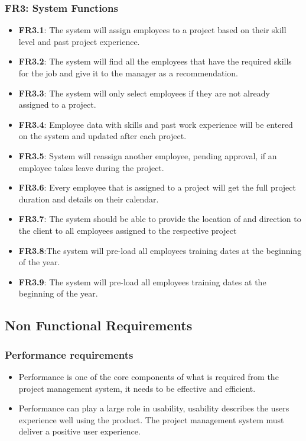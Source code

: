 \documentclass[a4paper,12pt]{article}
\begin{document}
	\subsubsection{FR3: System Functions}
	\begin{itemize}
		\item \textbf{FR3.1}: The system will assign employees to a project based
		on their skill level and past project experience. 
		
		\item \textbf{FR3.2}: The system will find all the employees that have the required skills     for the job and give it to the manager as a recommendation.
		
		\item \textbf{FR3.3}: The system will only select employees if they are not already           assigned to a project.
		
		\item \textbf{FR3.4}: Employee data with skills and past work experience
		will be entered on the system and updated after each project. 
		
		\item \textbf{FR3.5}: System will reassign another employee, pending 
		approval, if an employee takes leave during the project.
		
		\item \textbf{FR3.6}: Every employee that is assigned to a project will get
		the full project duration and details on their calendar. 
		
		\item \textbf{FR3.7}: The system should be able to provide the location of and direction      to the client to all employees assigned to the respective project
		
		\item \textbf{FR3.8}:The system will pre-load all employees training dates
		at the beginning of the year. 
		
		
		\item \textbf{FR3.9}: The system will pre-load all employees training dates at the beginning of the year.
	\end{itemize}
	
	
	\subsection{Non Functional Requirements}
	\subsubsection{Performance requirements}
	\textbf{}
	\begin{itemize}
		\item Performance is one of the core components of what is required from the project management system, it needs to be effective and efficient.
		
		\item Performance can play a large role in usability, usability describes the users experience well using the product. The project management system must deliver a positive user experience. 
	\end{itemize}
	
\end{document}
